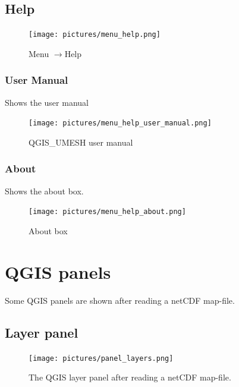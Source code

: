 \documentclass{deltares_memo}
\newcommand{\menuarrow}{$\rightarrow$}
\newcommand{\qumesh}{QGIS\_UMESH\xspace}
\newcommand{\qgis}{QGIS\xspace}
\newcommand{\netcdf}{netCDF\xspace}
\begin{document}
\subsection{Help}
\phantom{m}\vspace{-\baselineskip}
\begin{figure}[H]
    \centering
    \texttt{[image: pictures/menu\_help.png]}
    \caption{Menu \menuarrow Help}
\end{figure}

\subsubsection{User Manual}
Shows the user manual
\begin{figure}[H]
	\centering
	\texttt{[image: pictures/menu\_help\_user\_manual.png]}
	\caption{\qumesh user manual}
\end{figure}

\subsubsection{About}
Shows the about box.
\begin{figure}[H]
    \centering
    \texttt{[image: pictures/menu\_help\_about.png]}
    \caption{About box}
\end{figure}
\section{QGIS panels}
Some \qgis panels are shown after reading a \netcdf map-file.
\subsection{Layer panel}
\begin{figure}[H]
	\centering
	\texttt{[image: pictures/panel\_layers.png]}
	\caption{The \qgis layer panel after reading a \netcdf map-file.\label{fig:panel_layer}}
\end{figure}
\end{document}
